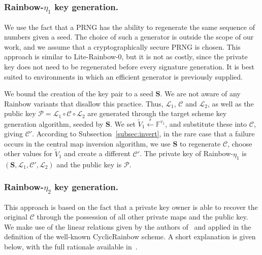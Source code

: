 \documentclass[draft, 12pt, a4paper, oneside]{memoir}
\newcommand{\random}{\overset{\mathsf{r}}{\gets}}
\theoremstyle{definition}
\begin{document}
\subsubsection{Rainbow-$\eta_{1}$ key generation.}

We use the fact that a PRNG has the ability to regenerate the same sequence of
numbers given a seed. The choice of such a generator is outside the scope of
our work, and we assume that a cryptographically secure PRNG is chosen. This
approach is similar to Lite-Rainbow-0, but it is not as costly, since the
private key does not need to be regenerated before every signature generation.
It is best suited to environments in which an efficient generator is previously
supplied.

We bound the creation of the key pair to a seed $\mathbf{S}$. We are not aware
of any Rainbow variants that disallow this practice. Thus, $\mathcal{L}_{1}$,
$\mathcal{C}$ and $\mathcal{L}_{2}$, as well as the public key
$\mathcal{P} = \mathcal{L}_{1} \circ \mathcal{C} \circ \mathcal{L}_{2}$ are generated
through the target scheme key generation algorithm, seeded by $\mathbf{S}$. We
set $\widetilde{V}_{1} \random \mathbb{F}^{v_{1}}$, and substitute these into
$\mathcal{C}$, giving $\mathcal{C}'$. According to
Subsection~\ref{subsec:invert}, in the rare case that a
failure occurs in the central map inversion algorithm, we use $\mathbf{S}$ to
regenerate $\mathcal{C}$, choose other values for $\widetilde{V}_{1}$ and
create a different $\mathcal{C}'$. The private key of Rainbow-$\eta_{1}$ is
$(\mathbf{S}, \mathcal{L}_{1}, \mathcal{C}', \mathcal{L}_{2})$ and the public key is
$\mathcal{P}$.

\subsubsection{Rainbow-$\eta_{2}$ key generation.}

This approach is based on the fact that a private key owner is able to recover
the original $\mathcal{C}$ through the possession of all other private maps and
the public key. We make use of the linear relations given by the authors
of~\cite{Petzoldt:201006} and applied in the definition of the
well-known CyclicRainbow scheme. A short explanation is given below, with the
full rationale available in~\cite[Chapter 7]{Petzoldt:201307}.
\end{document}
